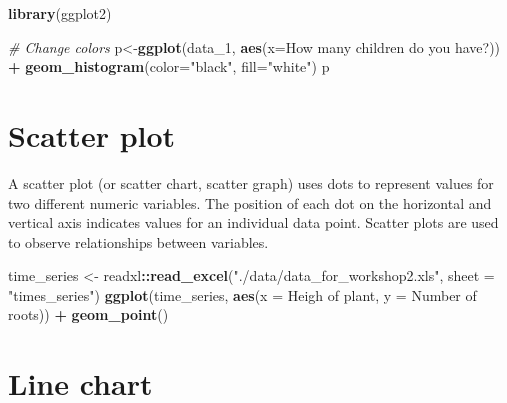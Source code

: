 \documentclass[
]{book}
\newenvironment{Shaded}{\begin{snugshade}}{\end{snugshade}}
\newcommand{\AttributeTok}[1]{\textcolor[rgb]{0.13,0.29,0.53}{#1}}
\newcommand{\CommentTok}[1]{\textcolor[rgb]{0.56,0.35,0.01}{\textit{#1}}}
\newcommand{\FunctionTok}[1]{\textcolor[rgb]{0.13,0.29,0.53}{\textbf{#1}}}
\newcommand{\NormalTok}[1]{#1}
\newcommand{\OtherTok}[1]{\textcolor[rgb]{0.56,0.35,0.01}{#1}}
\newcommand{\SpecialCharTok}[1]{\textcolor[rgb]{0.81,0.36,0.00}{\textbf{#1}}}
\newcommand{\StringTok}[1]{\textcolor[rgb]{0.31,0.60,0.02}{#1}}
\begin{document}
\begin{Shaded}
\begin{Highlighting}[]
\FunctionTok{library}\NormalTok{(ggplot2)}

\CommentTok{\# Change colors}
\NormalTok{p}\OtherTok{\textless{}{-}}\FunctionTok{ggplot}\NormalTok{(data\_1, }\FunctionTok{aes}\NormalTok{(}\AttributeTok{x=}\StringTok{\textasciigrave{}}\AttributeTok{How many children do you have?}\StringTok{\textasciigrave{}}\NormalTok{)) }\SpecialCharTok{+} 
  \FunctionTok{geom\_histogram}\NormalTok{(}\AttributeTok{color=}\StringTok{"black"}\NormalTok{, }\AttributeTok{fill=}\StringTok{"white"}\NormalTok{)}
\NormalTok{p}
\end{Highlighting}
\end{Shaded}

\hypertarget{scatter-plot}{%
\section{\texorpdfstring{Scatter plot\\
}{Scatter plot }}\label{scatter-plot}}

A scatter plot (or scatter chart, scatter graph) uses dots to represent values for two different numeric variables. The position of each dot on the horizontal and vertical axis indicates values for an individual data point. Scatter plots are used to observe relationships between variables.

\begin{Shaded}
\begin{Highlighting}[]
\NormalTok{time\_series }\OtherTok{\textless{}{-}}\NormalTok{ readxl}\SpecialCharTok{::}\FunctionTok{read\_excel}\NormalTok{(}\StringTok{"./data/data\_for\_workshop2.xls"}\NormalTok{, }\AttributeTok{sheet =} \StringTok{"times\_series"}\NormalTok{)}
\FunctionTok{ggplot}\NormalTok{(time\_series, }\FunctionTok{aes}\NormalTok{(}\AttributeTok{x =} \StringTok{\textasciigrave{}}\AttributeTok{Heigh of plant}\StringTok{\textasciigrave{}}\NormalTok{,}
                   \AttributeTok{y =} \StringTok{\textasciigrave{}}\AttributeTok{Number of roots}\StringTok{\textasciigrave{}}\NormalTok{)) }\SpecialCharTok{+}
\FunctionTok{geom\_point}\NormalTok{()}
\end{Highlighting}
\end{Shaded}

\hypertarget{line-chart}{%
\section{\texorpdfstring{Line chart\\
}{Line chart }}\label{line-chart}}
\end{document}
